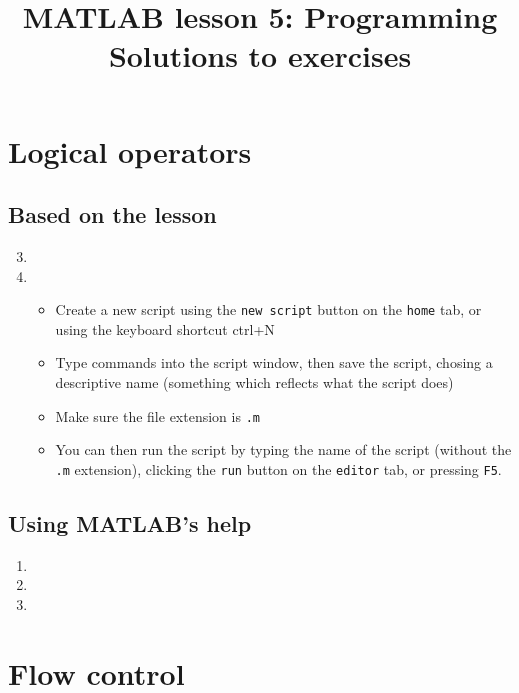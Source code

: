 \documentclass{article}
\title{MATLAB lesson 5: Programming\\Solutions to exercises}
\date{}
\author{} %
\begin{document}
	\maketitle
	
	\section{Logical operators}
	\subsection*{Based on the lesson}
		\begin{enumerate}
			\setcounter{enumi}{2}
			\item 
			\item 
			\begin{itemize}
				\item Create a new script using the \texttt{new script} button on the \texttt{home} tab, or using the keyboard shortcut ctrl+N
				\item Type commands into the script window, then save the script, chosing a descriptive name (something which reflects what the script does)
				\item Make sure the file extension is \texttt{.m} 
				\item You can then run the script by typing the name of the script (without the \texttt{.m} extension), clicking the \texttt{run} button on the \texttt{editor} tab, or pressing \texttt{F5}.
			\end{itemize}
		\end{enumerate}
	\subsection*{Using MATLAB's help}
	\begin{enumerate}[resume]
		\item 
		
		\item 
		
		\item 
	\end{enumerate}
	
	\section{Flow control}
\end{document}
